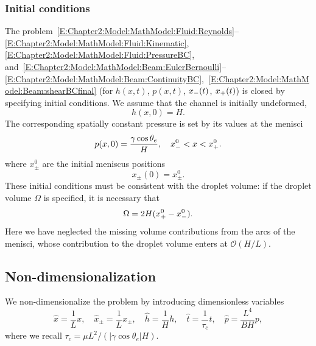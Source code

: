 \subsubsection{Initial conditions}
The problem~\eqref{E:Chapter2:Model:MathModel:Fluid:Reynolds}--\eqref{E:Chapter2:Model:MathModel:Fluid:Kinematic}, \eqref{E:Chapter2:Model:MathModel:Fluid:PressureBC}, and~\eqref{E:Chapter2:Model:MathModel:Beam:EulerBernoulli}--\eqref{E:Chapter2:Model:MathModel:Beam:ContinuityBC},~\eqref{E:Chapter2:Model:MathModel:Beam:shearBCfinal} (for $h(x,t)$, $p(x,t)$, $x_{-}(t)$, $x_{+}(t)$) is closed by specifying initial conditions. We assume that the channel is initially undeformed,
\begin{equation}\label{E:Chapter2:Model:MathModel:IC:IC_BeamShape}
h(x,0) = H.
\end{equation}
The corresponding spatially constant pressure is set by its values at the menisci
\begin{equation}\label{E:Chapter2:Model:MathModel:IC:IC_pressure}
p(x,0) = \frac{\gamma \cos\theta_e}{H}, \quad x_{-}^0< x <x_{+}^0.
\end{equation}
where $x_{\pm}^0$ are the initial meniscus positions
\begin{equation}\label{E:Chapter2:Model:MathModel:IC:IC_Menisci}
x_{\pm}(0) = x_{\pm}^0.
\end{equation}
These initial conditions must be consistent with the droplet volume: if the droplet volume $\Omega$ is specified, it is necessary that
\begin{equation}\label{E:Chapter2:Model:MathModel:IC:Volume}
\Omega = 2H (x_{+}^0 - x_{-}^0).
\end{equation}
Here we have neglected the missing volume contributions from the arcs of the menisci, whose contribution to the droplet volume enters at $\mathcal{O}(H/L)$. %

\subsection{Non-dimensionalization}\label{S:Chapter2:Model:NonDim}
We non-dimensionalize the problem by introducing dimensionless variables
\begin{equation}\label{E:Chapter2:Model:NonDim:Scalings}
\hat{x}= \frac{1}{L}x, \quad \hat{x}_{\pm} = \frac{1}{L}x_{\pm}, \quad \hat{h} = \frac{1}{H}h, \quad \hat{t} = \frac{1}{\tau_c}t, \quad \hat{p} = \frac{L^4}{B H}p,
\end{equation}
where we recall $\tau_c = \mu L^2 /(|\gamma \cos \theta_e |H)$.

